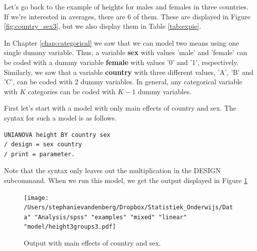 \documentclass[]{book}\usepackage[]{graphicx}\usepackage[]{color}
\begin{document}
Let's go back to the example of heights for males and females in three countries. If we're interested in averages, there are 6 of them. These are displayed in Figure \ref{fig:country_sex3}, but we also display them in Table \ref{tab:expie}.

In Chapter \ref{chap:categorical} we saw that we can model two means using one single dummy variable. Thus, a variable \textbf{sex} with values 'male' and 'female' can be coded with a dummy variable \textbf{female} with values '0' and '1', respectively. Similarly, we saw that a variable \textbf{country} with three different values, 'A', 'B' and 'C', can be coded with 2 dummy variables. In general, any categorical variable with $K$ categories can be coded with $K-1$ dummy variables.

% 

First let's start with a model with only main effects of country and sex. The syntax for such a model is as follows.

\begin{verbatim}
UNIANOVA height BY country sex 
/ design = sex country 
/ print = parameter.
\end{verbatim}

Note that the syntax only leaves out the multiplication in the DESIGN subcommand. When we run this model, we get the output displayed in Figure \ref{fig:interactionheightcountrysexMAIN}

\begin{figure}[h]
    \begin{center}
       \texttt{[image: /Users/stephanievandenberg/Dropbox/Statistiek\_Onderwijs/Data" "Analysis/spss" "examples" "mixed" "linear" "model/height3groups3.pdf]}
    \end{center}
    \caption{Output with main effects of country and sex.}
    \label{fig:interactionheightcountrysexMAIN}
\end{figure}
\end{document}
